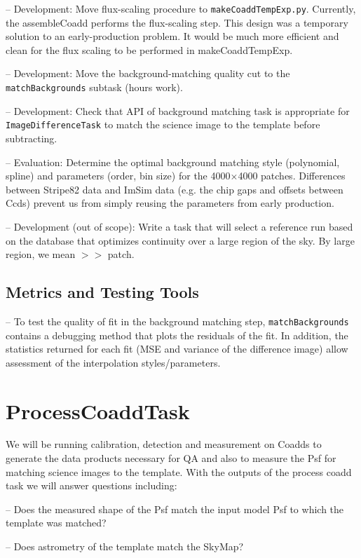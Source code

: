\documentclass[12pt]{article}
\begin{document}
-- Development: Move flux-scaling procedure to {\tt makeCoaddTempExp.py}.  Currently, the assembleCoadd performs the flux-scaling step. This design was a temporary solution to an early-production problem.  It would be much more efficient and clean for the flux scaling to be performed in makeCoaddTempExp.

-- Development:  Move the background-matching quality cut to the {\tt matchBackgrounds} subtask (hours work).

-- Development:  Check that API of background matching task is appropriate for {\tt ImageDifferenceTask} to match the science image to the template before subtracting. 

-- Evaluation: Determine the optimal background matching style (polynomial, spline) and parameters (order, bin size) for the 4000$\times$4000 patches. Differences between Stripe82 data and ImSim data (e.g. the chip gaps and offsets between Ccds) prevent us from simply reusing the parameters from early production.

-- Development (out of scope): Write a task that will select a reference run based on the database that optimizes continuity over a large region of the sky. By large region, we mean $>>$ patch. 

\subsection{Metrics and Testing Tools}

-- To test the quality of fit in the background matching step, {\tt matchBackgrounds} contains a debugging method that plots the residuals of the fit.  In addition, the statistics returned for each fit (MSE and variance of the difference image) allow assessment of the interpolation styles/parameters.


\section{ProcessCoaddTask} 
We will be running calibration, detection and measurement on Coadds to 
generate the data products necessary for QA and also to measure the Psf
for matching science images to the template.  With the outputs of the process coadd task we will answer questions including:

-- Does the measured shape of the Psf match the input model Psf to which the template was matched?

-- Does astrometry of the template match the SkyMap?
\end{document}

